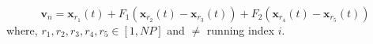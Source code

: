 $$\mathbf{v}_{n}=\mathbf{x}_{r_{1}}(t)
+F_{1}\left(\mathbf{x}_{r_{2}}(t)-\mathbf{x}_{r_{3}}(t)\right)
+F_{2}\left(\mathbf{x}_{r_{4}}(t)-\mathbf{x}_{r_{5}}(t)\right)$$
where, $r_1, r_2, r_3, r_4, r_5 \in [1, NP]$ and $\neq$ running index $i$. 